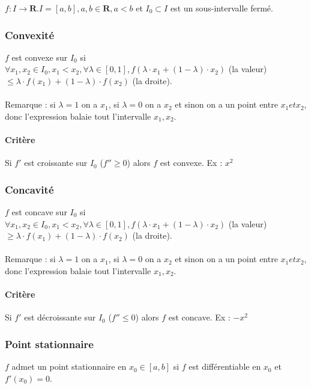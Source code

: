 \documentclass{article}
\begin{document}
$ f : I \to \mathbf{R}. I = [a, b], a, b \in \mathbf{R}, a < b $ et $ I_0 \subset I $ est un sous-intervalle fermé.\\

\subsubsection{Convexité}

$ f $ est convexe sur $ I_0 $ si $ \forall x_1, x_2 \in I_0, x_1 < x_2, \forall \lambda \in [0, 1], f(\lambda \cdot x_1 + (1-\lambda) \cdot x_2) $ (la valeur) $ \leq \lambda \cdot f(x_1) + (1-\lambda) \cdot f(x_2)$ (la droite).\\\\
Remarque : si $ \lambda = 1 $ on a $x_1$, si $ \lambda = 0 $ on a $ x_2 $ et sinon on a un point entre $ x_1 et x_2 $, donc l'expression balaie tout l'intervalle $ x_1, x_2$.

\paragraph{Critère} Si $f' $ est croissante sur $ I_0 $ ($f'' \geq 0$) alors $f $ est convexe. Ex : $ x^2 $

\subsubsection{Concavité}

$ f $ est concave sur $ I_0 $ si $ \forall x_1, x_2 \in I_0, x_1 < x_2, \forall \lambda \in [0, 1], f(\lambda \cdot x_1 + (1-\lambda) \cdot x_2) $ (la valeur) $ \geq \lambda \cdot f(x_1) + (1-\lambda) \cdot f(x_2)$ (la droite).\\\\
Remarque : si $ \lambda = 1 $ on a $x_1$, si $ \lambda = 0 $ on a $ x_2 $ et sinon on a un point entre $ x_1 et x_2 $, donc l'expression balaie tout l'intervalle $ x_1, x_2$.

\paragraph{Critère} Si $f' $ est décroissante sur $ I_0 $ ($f'' \leq 0$) alors $f $ est concave. Ex : $ -x^2 $

\subsubsection{Point stationnaire}

$ f $ admet un point stationnaire en $ x_0 \in [a, b] $ si $ f $ est différentiable en $ x_0 $ et $ f'(x_0) = 0$.
\end{document}

